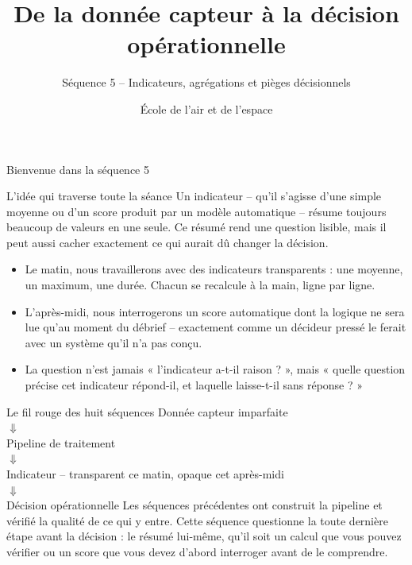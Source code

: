 \documentclass[aspectratio=169]{beamer}
\title{De la donnée capteur à la décision opérationnelle}
\subtitle{Séquence 5 -- Indicateurs, agrégations et pièges décisionnels}
\author{École de l'air et de l'espace}
\date{}
\begin{document}
\begin{frame}
  \titlepage
\end{frame}

\begin{frame}{Bienvenue dans la séquence 5}
  \begin{block}{L'idée qui traverse toute la séance}
    Un indicateur -- qu'il s'agisse d'une simple moyenne ou d'un score produit par un modèle automatique -- résume toujours beaucoup de valeurs en une seule. Ce résumé rend une question lisible, mais il peut aussi cacher exactement ce qui aurait dû changer la décision.
  \end{block}
  \begin{itemize}
    \item Le matin, nous travaillerons avec des indicateurs transparents : une moyenne, un maximum, une durée. Chacun se recalcule à la main, ligne par ligne.
    \item L'après-midi, nous interrogerons un score automatique dont la logique ne sera lue qu'au moment du débrief -- exactement comme un décideur pressé le ferait avec un système qu'il n'a pas conçu.
    \item La question n'est jamais « l'indicateur a-t-il raison ? », mais « quelle question précise cet indicateur répond-il, et laquelle laisse-t-il sans réponse ? »
  \end{itemize}
\end{frame}

\begin{frame}{Le fil rouge des huit séquences}
  \centering
  \Large Donnée capteur imparfaite\\[2mm]
  $\Downarrow$\\[-1mm]
  Pipeline de traitement\\[-1mm]
  $\Downarrow$\\[-1mm]
  Indicateur \alert{\normalsize -- transparent ce matin, opaque cet après-midi}\\[-1mm]
  $\Downarrow$\\[-1mm]
  Décision opérationnelle
  \vfill
  \normalsize Les séquences précédentes ont construit la pipeline et vérifié la qualité de ce qui y entre. Cette séquence questionne la toute dernière étape avant la décision : le résumé lui-même, qu'il soit un calcul que vous pouvez vérifier ou un score que vous devez d'abord interroger avant de le comprendre.
\end{frame}
\end{document}
